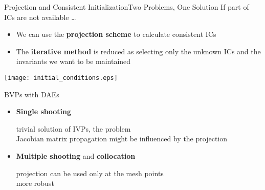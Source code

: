 \begin{frame}{Projection and Consistent Initialization}{Two Problems, One Solution}
  If part of ICs are not available \dots
  \begin{itemize}
    \item We can use the \textbf{projection scheme} to calculate consistent ICs
    \item The \textbf{iterative method} is reduced as selecting only the unknown ICs and the invariants we want to be maintained
  \end{itemize}
  \centering\texttt{[image: initial\_conditions.eps]}
\end{frame}

\begin{frame}{BVPs with DAEs}
  \begin{itemize}
    \item \textbf{Single shooting} \\
    \begin{small}
      \qquad trivial solution of IVPs, the problem \\
      \qquad Jacobian matrix propagation might be influenced by the projection
    \end{small}
    \item \textbf{Multiple shooting} and \textbf{collocation} \\
    \begin{small}
      \qquad projection can be used only at the mesh points \\
      \qquad more robust
    \end{small}
  \end{itemize}
\end{frame}

